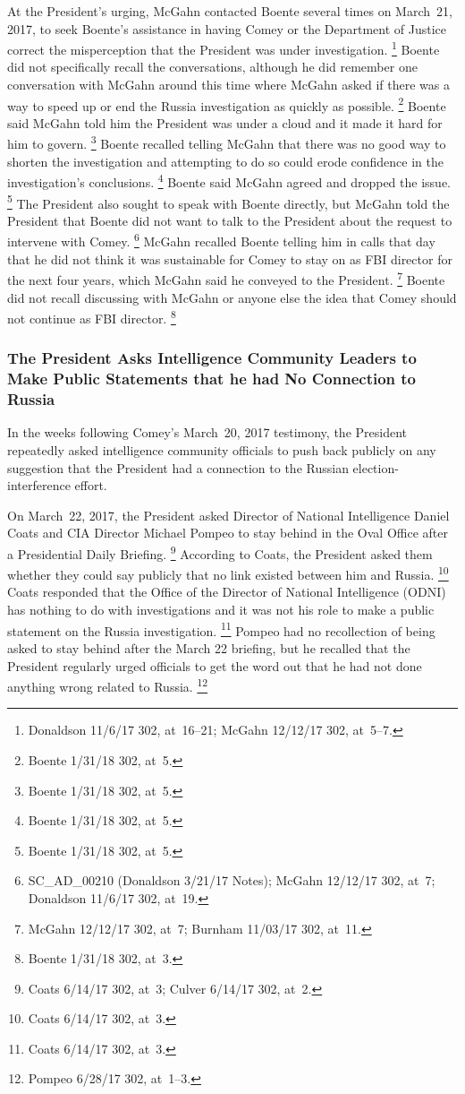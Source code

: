 At the President's urging, McGahn contacted Boente several times on March~21, 2017, to seek Boente's assistance in having Comey or the Department of Justice correct the misperception that the President was under investigation.%
\footnote{Donaldson 11/6/17 302, at~16--21;
McGahn 12/12/17 302, at~5--7.}
Boente did not specifically recall the conversations, although he did remember one conversation with McGahn around this time where McGahn asked if there was a way to speed up or end the Russia investigation as quickly as possible.%
\footnote{Boente 1/31/18 302, at~5.}
Boente said McGahn told him the President was under a cloud and it made it hard for him to govern.%
\footnote{Boente 1/31/18 302, at~5.}
Boente recalled telling McGahn that there was no good way to shorten the investigation and attempting to do so could erode confidence in the investigation's conclusions.%
\footnote{Boente 1/31/18 302, at~5.}
Boente said McGahn agreed and dropped the issue.%
\footnote{Boente 1/31/18 302, at~5.}
The President also sought to speak with Boente directly, but McGahn told the President that Boente did not want to talk to the President about the request to intervene with Comey.%
\footnote{SC\_AD\_00210 (Donaldson 3/21/17 Notes);
McGahn 12/12/17 302, at~7;
Donaldson 11/6/17 302, at~19.}
McGahn recalled Boente telling him in calls that day that he did not think it was sustainable for Comey to stay on as FBI director for the next four years, which McGahn said he conveyed to the President.%
\footnote{McGahn 12/12/17 302, at~7;
Burnham 11/03/17 302, at~11.}
Boente did not recall discussing with McGahn or anyone else the idea that Comey should not continue as FBI director.%
\footnote{Boente 1/31/18 302, at~3.}

\subsubsection{The President Asks Intelligence Community Leaders to Make Public Statements that he had No Connection to Russia}

In the weeks following Comey's March~20, 2017 testimony, the President repeatedly asked intelligence community officials to push back publicly on any suggestion that the President had a connection to the Russian election-interference effort.

On March~22, 2017, the President asked Director of National Intelligence Daniel Coats and CIA Director Michael Pompeo to stay behind in the Oval Office after a Presidential Daily Briefing.%
\footnote{Coats 6/14/17 302, at~3;
Culver 6/14/17 302, at~2.}
According to Coats, the President asked them whether they could say publicly that no link existed between him and Russia.%
\footnote{Coats 6/14/17 302, at~3.}
Coats responded that the Office of the Director of National Intelligence (ODNI) has nothing to do with investigations and it was not his role to make a public statement on the Russia investigation.%
\footnote{Coats 6/14/17 302, at~3.}
Pompeo had no recollection of being asked to stay behind after the March 22 briefing, but he recalled that the President regularly urged officials to get the word out that he had not done anything wrong related to Russia.%
\footnote{Pompeo 6/28/17 302, at~1--3.}

